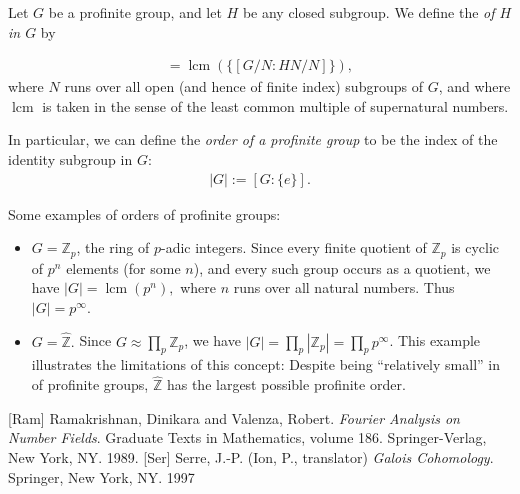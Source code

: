 \documentclass[12pt]{article}
\newcommand{\<}{\langle}
\renewcommand{\>}{\rangle}
\begin{document}
Let $G$ be a profinite group, and let $H$ be any closed subgroup.  We define the \emph{ of $H$ in $G$} by

\begin{align*}
[G:H]=\operatorname{lcm}(\{[G/N:HN/N]\}),
\end{align*}
where $N$ runs over all open (and hence of finite index) subgroups of $G$, and where $\operatorname{lcm}$ is taken in the sense of the least common multiple of supernatural numbers.

In particular, we can define the \emph{order of a profinite group} to be the index of the identity subgroup in $G$:
\begin{align*}
|G|:=[G:\{e\}].
\end{align*}

Some examples of orders of profinite groups:
\begin{itemize}
\item $G=\mathbb{Z}_p$, the ring of $p$-adic integers.  Since every finite quotient of $\mathbb{Z}_p$ is cyclic of $p^n$ elements (for some $n$), and every such group occurs as a quotient, we have $|G|=\operatorname{lcm}(p^n),$ where $n$ runs over all natural numbers.  Thus $|G|=p^\infty$. 
\item $G=\widehat{\mathbb{Z}}.$  Since $G\approx\prod_p\mathbb{Z}_p$, we have $|G|=\prod_p |\mathbb{Z}_p|=\prod_p p^\infty$.  This example illustrates the limitations of this concept:  Despite being ``relatively small'' in  of profinite groups, $\widehat{\mathbb{Z}}$ has the largest possible profinite order.
\end{itemize}


\begin{thebibliography}{9}
[Ram] Ramakrishnan, Dinikara and Valenza, Robert. \emph{Fourier Analysis on Number Fields}. Graduate Texts in Mathematics, volume 186. Springer-Verlag, New York, NY. 1989.
[Ser] Serre, J.-P. (Ion, P., translator) \emph{Galois Cohomology}. Springer, New York, NY. 1997
\end{thebibliography}
\end{document}
